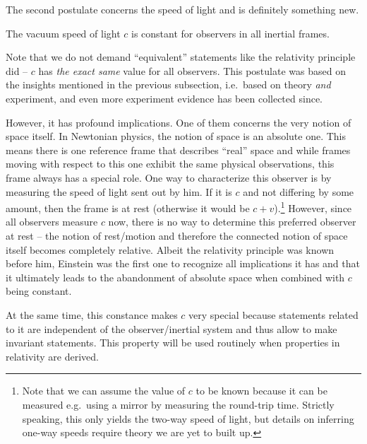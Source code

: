 \documentclass[../relativity_main.tex]{subfiles}
\begin{document}
The second postulate concerns the speed of light and is definitely something new.
\begin{post}\label{post:c_constant}
	The vacuum speed of light $c$ is constant for observers in all inertial frames.
\end{post}
Note that we do not demand \enquote{equivalent} statements like the relativity principle did -- $c$ has \emph{the exact same} value for all observers. This postulate was based on the insights mentioned in the previous subsection, i.e.~based on theory \emph{and} experiment, and even more experiment evidence has been collected since.

However, it has profound implications. One of them concerns the very notion of space itself. In Newtonian physics, the notion of space is an absolute one. This means there is one reference frame that describes \enquote{real} space and while frames moving with respect to this one exhibit the same physical observations, this frame always has a special role. One way to characterize this observer is by measuring the speed of light sent out by him. If it is $c$ and not differing by some amount, then the frame is at rest (otherwise it would be $c + v$).\footnote{Note that we can assume the value of $c$ to be known because it can be measured e.g.~using a mirror by measuring the round-trip time. Strictly speaking, this only yields the two-way speed of light, but details on inferring one-way speeds require theory we are yet to built up.} However, since all observers measure $c$ now, there is no way to determine this preferred observer at rest -- the notion of rest/motion and therefore the connected notion of space itself becomes completely relative. Albeit the relativity principle was known before him, Einstein was the first one to recognize all implications it has and that it ultimately leads to the abandonment of absolute space when combined with $c$ being constant.


At the same time, this constance makes $c$ very special because statements related to it are independent of the observer/inertial system and thus allow to make invariant statements. This property will be used routinely when properties in relativity are derived.\\
\end{document}
